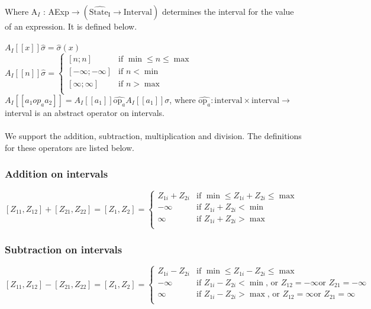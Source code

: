 Where A$_I$ : AExp$ \rightarrow (\widehat{\text{State}_{\text{I}}} \rightarrow \text{Interval})$ determines the interval for the value of an expression. It is defined below.\\\\

$A_I[\![x]\!]\widehat{\sigma} = \widehat{\sigma}(x)$ \\
$A_I[\![n]\!]\widehat{\sigma} = 
     \begin{cases} 
        [n;n] & \text{if } \min \leq n \leq \max \\
        [-\infty;-\infty] & \text{if } n < \min\\
        [\infty;\infty] & \text{if } n > \max\\
     \end{cases}$\\

$A_I[\![a_1 op_a a_2 ]\!] = A_I[\![a_1]\!] \widehat{\text{op}_a} A_I[\![a_1]\!]\sigma $, where $  \widehat{\text{op}_a} : \text{interval} \times \text{interval} \rightarrow $  interval is an abstract operator on intervals.\\
\\
We support the addition, subtraction, multiplication and division. The definitions for these operators are listed below.

\subsubsection{Addition on intervals}
$[Z_{11},Z_{12}] + [Z_{21},Z_{22}] = [Z_{1},Z_{2}] =
     \begin{cases} 
        Z_{1i} + Z_{2i} & \text{if } \min \leq Z_{1i} + Z_{2i} \leq \max \\
        -\infty         & \text{if } Z_{1i} + Z_{2i} < \min \\
        \infty          & \text{if } Z_{1i} + Z_{2i} > \max\\
     \end{cases}
$

\subsubsection{Subtraction on intervals}
$[Z_{11},Z_{12}] - [Z_{21},Z_{22}] = [Z_{1},Z_{2}] =
     \begin{cases} 
        Z_{1i} - Z_{2i} & \text{if } \min \leq Z_{1i} - Z_{2i} \leq \max \\
        -\infty         & \text{if } Z_{1i} - Z_{2i} < \min \text{, or } Z_12 = -\infty  \text{or } Z_21 = -\infty\\
        \infty          & \text{if } Z_{1i} - Z_{2i} > \max \text{, or } Z_12 = \infty  \text{or } Z_21 = \infty\\
     \end{cases}
$

